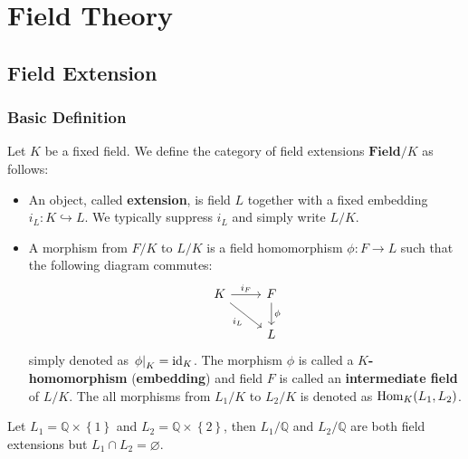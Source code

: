 \chapter{Field Theory} %

\section{Field Extension} %
\subsection{Basic Definition} %


\begin{definition}
    Let $K$ be a fixed field. We define the category of field   extensions $\mathbf{Field}/K$ as follows:
    \begin{itemize}
        \item
              An object, called \textbf{extension}, is field $L$ together with a fixed embedding $i_L:K\hookrightarrow L$.
              We typically suppress $i_L$ and simply write $L/K$.

        \item
              A morphism from $F/K$ to $L/K$ is a field homomorphism $\phi:F\rightarrow L$ such that the following diagram commutes:
              \begin{equation*}
                  \begin{tikzcd}
                      K \arrow[r, "i_{F}"] \arrow[rd, "i_L"'] & F \arrow[d, "\phi"] \\
                      & L
                  \end{tikzcd}
              \end{equation*}
              simply denoted as $\left.\phi\right|_K=\operatorname{\operatorname{id}}_K$.
              The morphism $\phi$ is called a \textbf{$K$-homomorphism} (\textbf{embedding}) and field $F$ is called an \textbf{intermediate field} of $L/K$.
              The all morphisms from $L_1/K$ to $L_2/K$ is denoted as $\operatorname{\operatorname{Hom}}_K(L_1,L_2)$.
    \end{itemize}
    \begin{remark}
        Let $L_1=\mathbb{Q}\times\left\{1\right\}$ and $L_2=\mathbb{Q}\times\left\{2\right\}$, then $L_1/\mathbb{Q}$ and $L_2/\mathbb{Q}$ are both field extensions but $L_1\cap L_2=\varnothing$.
    \end{remark}
\end{definition}




